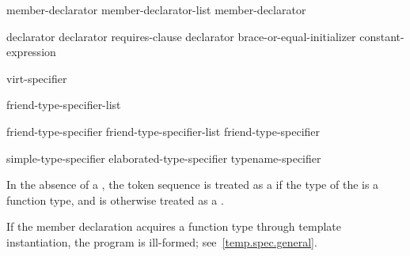 \begin{bnf}
\br
    member-declarator\br
    member-declarator-list \terminal{,} member-declarator
\end{bnf}

\begin{bnf}
\br
    declarator  \br
    declarator requires-clause\br
    declarator brace-or-equal-initializer\br
      \terminal{:} constant-expression 
\end{bnf}

\begin{bnf}
\br
    virt-specifier 
\end{bnf}

\begin{bnf}
\br
    \br
\end{bnf}

\begin{bnf}
\br
    \terminal{=} 
\end{bnf}

\begin{bnf}
\br
     friend-type-specifier-list \terminal{;}
\end{bnf}

\begin{bnf}
\br
    friend-type-specifier \br
    friend-type-specifier-list \terminal{,} friend-type-specifier 
\end{bnf}

\begin{bnf}
\br
    simple-type-specifier\br
    elaborated-type-specifier\br
    typename-specifier
\end{bnf}

\pnum
In the absence of a ,
the token sequence  is treated as a 
if the type of the 
is a function type, and
is otherwise treated as a .
\begin{note}
If the member declaration acquires a function type through
template instantiation,
the program is ill-formed; see~\ref{temp.spec.general}.
\end{note}

